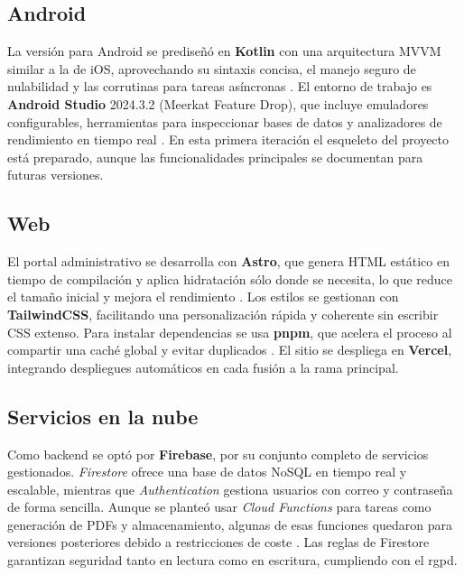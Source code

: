\subsection{Android}

\begin{large}

La versión para Android se prediseñó en \textbf{Kotlin} con una arquitectura MVVM similar a la de iOS, aprovechando su sintaxis concisa, el manejo seguro de nulabilidad y las corrutinas para tareas asíncronas \cite{kotlin_lang2025}. El entorno de trabajo es \textbf{Android Studio} 2024.3.2 (Meerkat Feature Drop), que incluye emuladores configurables, herramientas para inspeccionar bases de datos y analizadores de rendimiento en tiempo real \cite{as2024_3_2}. En esta primera iteración el esqueleto del proyecto está preparado, aunque las funcionalidades principales se documentan para futuras versiones.

\end{large}

\subsection{Web}

\begin{large}

El portal administrativo se desarrolla con \textbf{Astro}, que genera HTML estático en tiempo de compilación y aplica hidratación sólo donde se necesita, lo que reduce el tamaño inicial y mejora el rendimiento \cite{astro_docs2025}. Los estilos se gestionan con \textbf{TailwindCSS}, facilitando una personalización rápida y coherente sin escribir CSS extenso. Para instalar dependencias se usa \textbf{pnpm}, que acelera el proceso al compartir una caché global y evitar duplicados \cite{pnpm_docs2025}. El sitio se despliega en \textbf{Vercel}, integrando despliegues automáticos en cada fusión a la rama principal.

\end{large}

\subsection{Servicios en la nube}

\begin{large}

Como backend se optó por \textbf{Firebase}, por su conjunto completo de servicios gestionados. \textit{Firestore} ofrece una base de datos NoSQL en tiempo real y escalable, mientras que \textit{Authentication} gestiona usuarios con correo y contraseña de forma sencilla. Aunque se planteó usar \textit{Cloud Functions} para tareas como generación de PDFs y almacenamiento, algunas de esas funciones quedaron para versiones posteriores debido a restricciones de coste \cite{firebase_docs2025}. Las reglas de Firestore garantizan seguridad tanto en lectura como en escritura, cumpliendo con el \gls{rgpd}.

\end{large}

